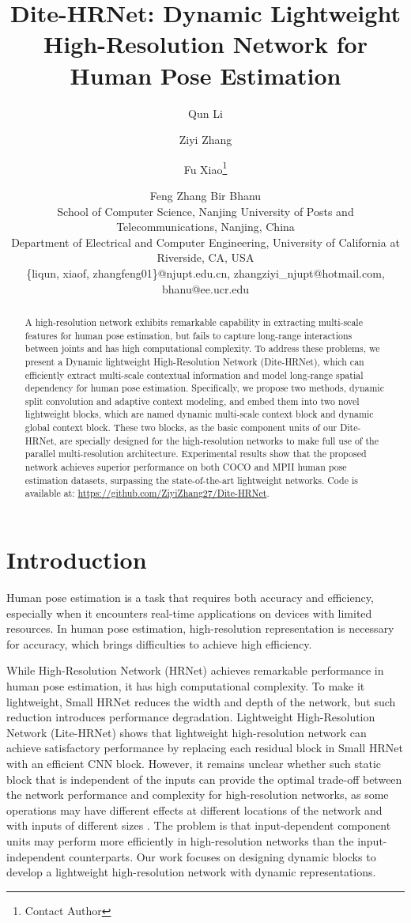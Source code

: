 \documentclass{article}
\title{Dite-HRNet: Dynamic Lightweight High-Resolution Network for Human Pose Estimation}
\author{
Qun Li\and
Ziyi Zhang\and
Fu Xiao\footnote{Contact Author}\and
Feng Zhang\And
Bir Bhanu\\ 
\affiliations
School of Computer Science, Nanjing University of Posts and Telecommunications, Nanjing, China\\ 
Department of Electrical and Computer Engineering, University of California at Riverside, CA, USA\\
\emails
\{liqun, xiaof, zhangfeng01\}@njupt.edu.cn,
zhangziyi\_njupt@hotmail.com,
bhanu@ee.ucr.edu
}
\begin{document}
\maketitle

\begin{abstract}
A high-resolution network exhibits remarkable capability in extracting multi-scale features for human pose estimation, but fails to capture long-range interactions between joints and has high computational complexity. To address these problems, we present a Dynamic lightweight High-Resolution Network (Dite-HRNet), which can efficiently extract multi-scale contextual information and model long-range spatial dependency for human pose estimation. Specifically, we propose two methods, dynamic split convolution and adaptive context modeling, and embed them into two novel lightweight blocks, which are named dynamic multi-scale context block and dynamic global context block. These two blocks, as the basic component units of our Dite-HRNet, are specially designed for the high-resolution networks to make full use of the parallel multi-resolution architecture. Experimental results show that the proposed network achieves superior performance on both COCO and MPII human pose estimation datasets, surpassing the state-of-the-art lightweight networks. Code is available at: \url{https://github.com/ZiyiZhang27/Dite-HRNet}.
\end{abstract}

\section{Introduction}
Human pose estimation is a task that requires both accuracy and efficiency, especially when it encounters real-time applications on devices with limited resources. In human pose estimation, high-resolution representation is necessary for accuracy, which brings difficulties to achieve high efficiency. 

While High-Resolution Network (HRNet) \cite{sun:hrnet} achieves remarkable performance in human pose estimation, it has high computational complexity. To make it lightweight, Small HRNet \cite{wang:smallhrnet} reduces the width and depth of the network, but such reduction introduces performance degradation. Lightweight High-Resolution Network (Lite-HRNet) \cite{yu:litehrnet} shows that lightweight high-resolution network can achieve satisfactory performance by replacing each residual block in Small HRNet with an efficient CNN block. However, it remains unclear whether such static block that is independent of the inputs can provide the optimal trade-off between the network performance and complexity for high-resolution networks, as some operations may have different effects at different locations of the network and with inputs of different sizes \cite{cui:pplcnet}. The problem is that input-dependent component units may perform more efficiently in high-resolution networks than the input-independent counterparts. Our work focuses on designing dynamic blocks to develop a lightweight high-resolution network with dynamic representations.
\end{document}
